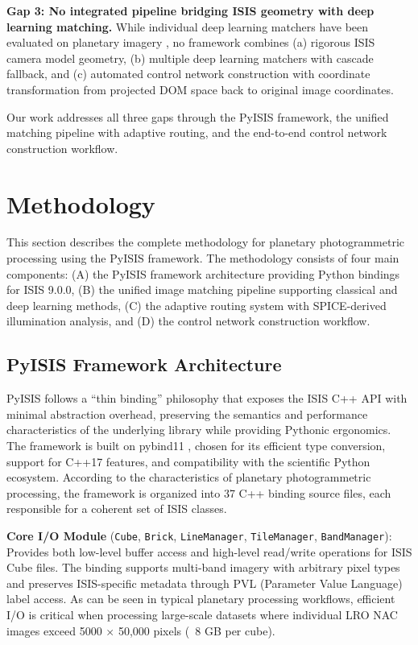 \documentclass[lettersize,journal]{IEEEtran}
\newcommand{\pyisis}{PyISIS}
\begin{document}
\textbf{Gap 3: No integrated pipeline bridging ISIS geometry with deep learning matching.} While individual deep learning matchers have been evaluated on planetary imagery \cite{ye2024planetary,yutu2_2024}, no framework combines (a) rigorous ISIS camera model geometry, (b) multiple deep learning matchers with cascade fallback, and (c) automated control network construction with coordinate transformation from projected DOM space back to original image coordinates.

Our work addresses all three gaps through the \pyisis{} framework, the unified matching pipeline with adaptive routing, and the end-to-end control network construction workflow.


\section{Methodology}\label{sec:methodology}

This section describes the complete methodology for planetary photogrammetric processing using the \pyisis{} framework. The methodology consists of four main components: (A) the \pyisis{} framework architecture providing Python bindings for ISIS 9.0.0, (B) the unified image matching pipeline supporting classical and deep learning methods, (C) the adaptive routing system with SPICE-derived illumination analysis, and (D) the control network construction workflow.

\subsection{PyISIS Framework Architecture}

\pyisis{} follows a ``thin binding'' philosophy that exposes the ISIS C++ API with minimal abstraction overhead, preserving the semantics and performance characteristics of the underlying library while providing Pythonic ergonomics. The framework is built on pybind11 \cite{jakob2017pybind11}, chosen for its efficient type conversion, support for C++17 features, and compatibility with the scientific Python ecosystem. According to the characteristics of planetary photogrammetric processing, the framework is organized into 37 C++ binding source files, each responsible for a coherent set of ISIS classes.

\textbf{Core I/O Module} (\texttt{Cube}, \texttt{Brick}, \texttt{LineManager}, \texttt{TileManager}, \texttt{BandManager}): Provides both low-level buffer access and high-level read/write operations for ISIS Cube files. The binding supports multi-band imagery with arbitrary pixel types and preserves ISIS-specific metadata through PVL (Parameter Value Language) label access. As can be seen in typical planetary processing workflows, efficient I/O is critical when processing large-scale datasets where individual LRO NAC images exceed 5000 $\times$ 50,000 pixels (~8 GB per cube).
\end{document}
